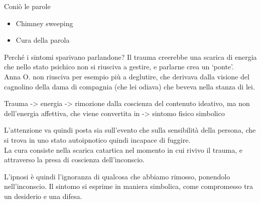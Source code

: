 \documentclass[
]{article}
\providecommand{\tightlist}{%
  \setlength{\itemsep}{0pt}\setlength{\parskip}{0pt}}
\begin{document}
Coniò le parole

\begin{itemize}
\tightlist
\item
  Chimney sweeping
\item
  Cura della parola
\end{itemize}

Perché i sintomi sparivano parlandone? Il trauma creerebbe una scarica
di energia che nello stato psichico non si riusciva a gestire, e
parlarne crea un `ponte'.\\
Anna O. non riusciva per esempio più a deglutire, che derivava dalla
visione del cagnolino della dama di compagnia (che lei odiava) che
beveva nella stanza di lei.

Trauma -\textgreater{} energia -\textgreater{} rimozione dalla coscienza
del contenuto ideativo, ma non dell'energia affettiva, che viene
convertita in -\textgreater{} sintomo fisico simbolico

L'attenzione va quindi posta sia sull'evento che sulla sensibilità della
persona, che si trova in uno stato autoipnotico quindi incapace di
fuggire.\\
La cura consiste nella scarica catartica nel momento in cui rivivo il
trauma, e attraverso la presa di coscienza dell'inconscio.

L'ipnosi è quindi l'ignoranza di qualcosa che abbiamo rimosso, ponendolo
nell'inconscio. Il sintomo si esprime in maniera simbolica, come
compromesso tra un desiderio e una difesa.
\end{document}

